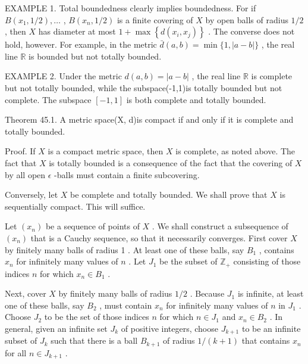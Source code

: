 EXAMPLE 1. Total boundedness clearly implies boundedness. For if \(B\left( {{x}_{1},1/2}\right) ,\ldots\) , \(B\left( {{x}_{n},1/2}\right)\) is a finite covering of \(X\) by open balls of radius \(1/2\) , then \(X\) has diameter at most \(1 + \max \left\{  {d\left( {{x}_{i},{x}_{j}}\right) }\right\}\) . The converse does not hold, however. For example, in the metric \(\bar{d}\left( {a,b}\right)  = \min \{ 1,\left| {a - b}\right| \}\) , the real line \(\mathbb{R}\) is bounded but not totally bounded.

EXAMPLE 2. Under the metric \(d\left( {a,b}\right)  = \left| {a - b}\right|\) , the real line \(\mathbb{R}\) is complete but not totally bounded, while the subspace(-1,1)is totally bounded but not complete. The subspace \(\left\lbrack  {-1,1}\right\rbrack\) is both complete and totally bounded.

Theorem 45.1. A metric space(X, d)is compact if and only if it is complete and totally bounded.

Proof. If \(X\) is a compact metric space, then \(X\) is complete, as noted above. The fact that \(X\) is totally bounded is a consequence of the fact that the covering of \(X\) by all open \(\epsilon\) -balls must contain a finite subcovering.

Conversely, let \(X\) be complete and totally bounded. We shall prove that \(X\) is sequentially compact. This will suffice.

Let \(\left( {x}_{n}\right)\) be a sequence of points of \(X\) . We shall construct a subsequence of \(\left( {x}_{n}\right)\) that is a Cauchy sequence, so that it necessarily converges. First cover \(X\) by finitely many balls of radius 1 . At least one of these balls, say \({B}_{1}\) , contains \({x}_{n}\) for infinitely many values of \(n\) . Let \({J}_{1}\) be the subset of \({\mathbb{Z}}_{ + }\) consisting of those indices \(n\) for which \({x}_{n} \in  {B}_{1}\) .

Next, cover \(X\) by finitely many balls of radius \(1/2\) . Because \({J}_{1}\) is infinite, at least one of these balls, say \({B}_{2}\) , must contain \({x}_{n}\) for infinitely many values of \(n\) in \({J}_{1}\) . Choose \({J}_{2}\) to be the set of those indices \(n\) for which \(n \in  {J}_{1}\) and \({x}_{n} \in  {B}_{2}\) . In general, given an infinite set \({J}_{k}\) of positive integers, choose \({J}_{k + 1}\) to be an infinite subset of \({J}_{k}\) such that there is a ball \({B}_{k + 1}\) of radius \(1/\left( {k + 1}\right)\) that contains \({x}_{n}\) for all \(n \in  {J}_{k + 1}\) .

